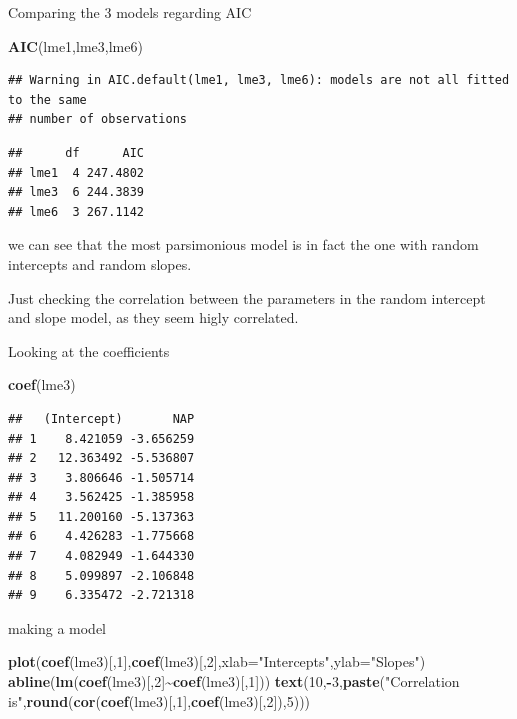 \documentclass[
]{book}
\newenvironment{Shaded}{\begin{snugshade}}{\end{snugshade}}
\newcommand{\AttributeTok}[1]{\textcolor[rgb]{0.13,0.29,0.53}{#1}}
\newcommand{\DecValTok}[1]{\textcolor[rgb]{0.00,0.00,0.81}{#1}}
\newcommand{\FunctionTok}[1]{\textcolor[rgb]{0.13,0.29,0.53}{\textbf{#1}}}
\newcommand{\NormalTok}[1]{#1}
\newcommand{\SpecialCharTok}[1]{\textcolor[rgb]{0.81,0.36,0.00}{\textbf{#1}}}
\newcommand{\StringTok}[1]{\textcolor[rgb]{0.31,0.60,0.02}{#1}}
\begin{document}
Comparing the 3 models regarding AIC

\begin{Shaded}
\begin{Highlighting}[]
\FunctionTok{AIC}\NormalTok{(lme1,lme3,lme6)}
\end{Highlighting}
\end{Shaded}

\begin{verbatim}
## Warning in AIC.default(lme1, lme3, lme6): models are not all fitted to the same
## number of observations
\end{verbatim}

\begin{verbatim}
##      df      AIC
## lme1  4 247.4802
## lme3  6 244.3839
## lme6  3 267.1142
\end{verbatim}

we can see that the most parsimonious model is in fact the one with random intercepts and random slopes.

Just checking the correlation between the parameters in the random intercept and slope model, as they seem higly correlated.

Looking at the coefficients

\begin{Shaded}
\begin{Highlighting}[]
\FunctionTok{coef}\NormalTok{(lme3)}
\end{Highlighting}
\end{Shaded}

\begin{verbatim}
##   (Intercept)       NAP
## 1    8.421059 -3.656259
## 2   12.363492 -5.536807
## 3    3.806646 -1.505714
## 4    3.562425 -1.385958
## 5   11.200160 -5.137363
## 6    4.426283 -1.775668
## 7    4.082949 -1.644330
## 8    5.099897 -2.106848
## 9    6.335472 -2.721318
\end{verbatim}

making a model

\begin{Shaded}
\begin{Highlighting}[]
\FunctionTok{plot}\NormalTok{(}\FunctionTok{coef}\NormalTok{(lme3)[,}\DecValTok{1}\NormalTok{],}\FunctionTok{coef}\NormalTok{(lme3)[,}\DecValTok{2}\NormalTok{],}\AttributeTok{xlab=}\StringTok{"Intercepts"}\NormalTok{,}\AttributeTok{ylab=}\StringTok{"Slopes"}\NormalTok{)}
\FunctionTok{abline}\NormalTok{(}\FunctionTok{lm}\NormalTok{(}\FunctionTok{coef}\NormalTok{(lme3)[,}\DecValTok{2}\NormalTok{]}\SpecialCharTok{\textasciitilde{}}\FunctionTok{coef}\NormalTok{(lme3)[,}\DecValTok{1}\NormalTok{]))}
\FunctionTok{text}\NormalTok{(}\DecValTok{10}\NormalTok{,}\SpecialCharTok{{-}}\DecValTok{3}\NormalTok{,}\FunctionTok{paste}\NormalTok{(}\StringTok{"Correlation is"}\NormalTok{,}\FunctionTok{round}\NormalTok{(}\FunctionTok{cor}\NormalTok{(}\FunctionTok{coef}\NormalTok{(lme3)[,}\DecValTok{1}\NormalTok{],}\FunctionTok{coef}\NormalTok{(lme3)[,}\DecValTok{2}\NormalTok{]),}\DecValTok{5}\NormalTok{)))}
\end{Highlighting}
\end{Shaded}
\end{document}
